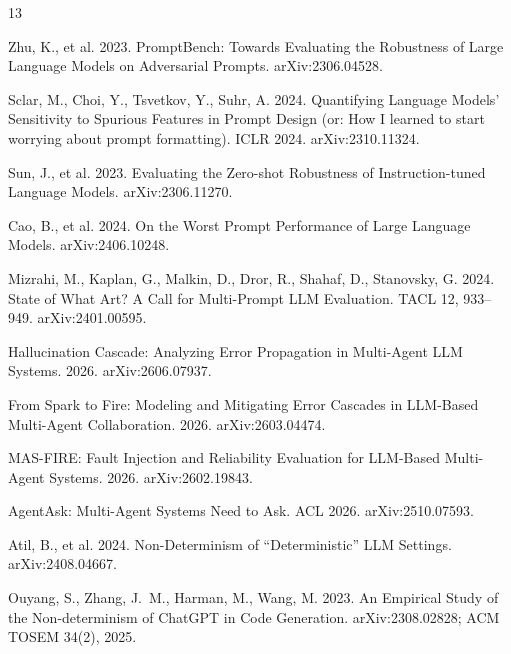 \documentclass[11pt]{article}
\begin{document}
\begin{thebibliography}{13}

Zhu, K., et al. 2023.
\newblock PromptBench: Towards Evaluating the Robustness of Large Language
Models on Adversarial Prompts.
\newblock arXiv:2306.04528.

Sclar, M., Choi, Y., Tsvetkov, Y., Suhr, A. 2024.
\newblock Quantifying Language Models' Sensitivity to Spurious Features in
Prompt Design (or: How I learned to start worrying about prompt formatting).
\newblock ICLR 2024. arXiv:2310.11324.

Sun, J., et al. 2023.
\newblock Evaluating the Zero-shot Robustness of Instruction-tuned Language
Models.
\newblock arXiv:2306.11270.

Cao, B., et al. 2024.
\newblock On the Worst Prompt Performance of Large Language Models.
\newblock arXiv:2406.10248.

Mizrahi, M., Kaplan, G., Malkin, D., Dror, R., Shahaf, D., Stanovsky, G.
2024.
\newblock State of What Art? A Call for Multi-Prompt LLM Evaluation.
\newblock TACL 12, 933--949. arXiv:2401.00595.

Hallucination Cascade: Analyzing Error Propagation in Multi-Agent LLM
Systems. 2026.
\newblock arXiv:2606.07937.

From Spark to Fire: Modeling and Mitigating Error Cascades in LLM-Based
Multi-Agent Collaboration. 2026.
\newblock arXiv:2603.04474.

MAS-FIRE: Fault Injection and Reliability Evaluation for LLM-Based
Multi-Agent Systems. 2026.
\newblock arXiv:2602.19843.

AgentAsk: Multi-Agent Systems Need to Ask.
\newblock ACL 2026. arXiv:2510.07593.

Atil, B., et al. 2024.
\newblock Non-Determinism of ``Deterministic'' LLM Settings.
\newblock arXiv:2408.04667.

Ouyang, S., Zhang, J.~M., Harman, M., Wang, M. 2023.
\newblock An Empirical Study of the Non-determinism of ChatGPT in Code
Generation.
\newblock arXiv:2308.02828; ACM TOSEM 34(2), 2025.


\end{thebibliography}
\end{document}
